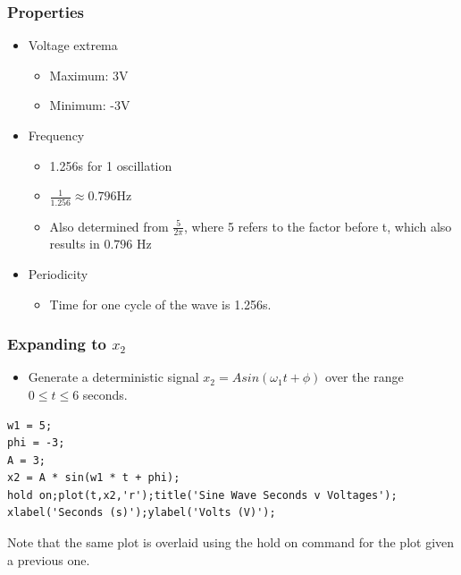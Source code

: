 \documentclass[12pt]{article}
\begin{document}
\subsubsection{Properties}
\begin{itemize}
\item Voltage extrema
\begin{itemize}
\item Maximum: 3V
\item Minimum: -3V
\end{itemize}
\item Frequency
\begin{itemize}
\item 1.256s for 1 oscillation
\item $\frac{1}{1.256} \approx 0.796$Hz
\item Also determined from $\frac{5}{2\pi}$, where 5 refers to the factor before t, which also results in $0.796$ Hz
\end{itemize}
\item Periodicity
\begin{itemize}
\item Time for one cycle of the wave is 1.256s.
\end{itemize}
\end{itemize}

\subsubsection{Expanding to $x_2$}
\begin{itemize}
\item Generate a deterministic signal $x_2=Asin(\omega_{1}t + \phi)$ over the range $0 \leq t \leq 6$ seconds.
\end{itemize}

\begin{lstlisting}
w1 = 5;
phi = -3;
A = 3;
x2 = A * sin(w1 * t + phi);
hold on;plot(t,x2,'r');title('Sine Wave Seconds v Voltages');
xlabel('Seconds (s)');ylabel('Volts (V)');
\end{lstlisting}

Note that the same plot is overlaid using the hold on command for the plot given a previous one.
\end{document}
